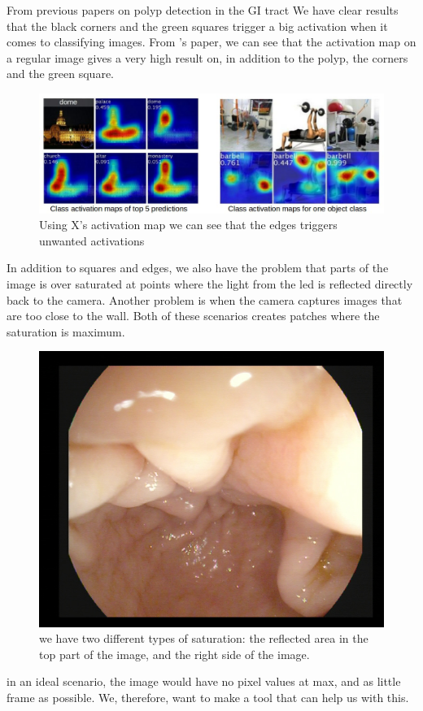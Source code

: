   From previous papers on polyp detection in the GI tract %
We have clear results that the black corners and the green squares trigger a big activation %
  when it comes to classifying images. 
  From %
  's paper, we can see that the activation map on a regular image gives a very high result on, in addition to the polyp, the corners and the green square. 
  \begin{figure}[ht]
    \centering
    \includegraphics[scale=0.5]{background/figures/placeholder.jpeg}
    \caption{Using X's activation map we can see that the edges triggers unwanted activations}
  \end{figure}
  
  In addition to squares and edges, we also have the problem that parts of the image is over saturated at points where the light from the led is reflected directly back to the camera.
  Another problem is when the camera captures images that are too close to the wall. Both of these scenarios creates patches where the saturation is maximum. 
   \begin{figure}[ht]
    \centering
    \includegraphics[scale=0.5]{background/figures/reflection.jpg}
    \caption{we have two different types of saturation: the reflected area in the top part of the image, and the right side of the image.}
  \end{figure}
  in an ideal scenario, the image would have no pixel values at max, and as little frame as possible. 
  We, therefore, want to make a tool that can help us with this.
